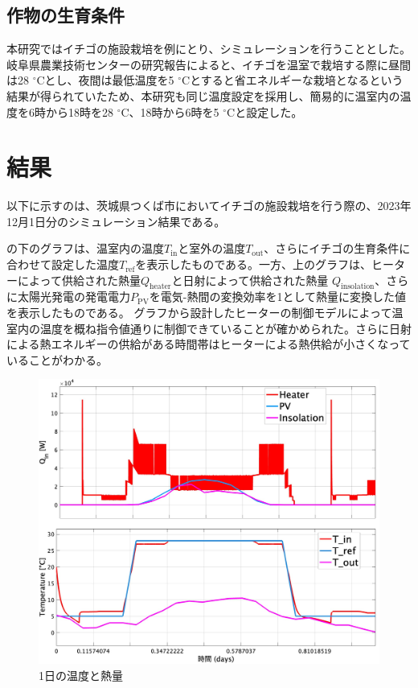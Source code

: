 \documentclass[uplatex,dvipdfmx,nomag,a4paper,oneside,onecolumn,12pt]{bxjsreport} %
\begin{document}
\section{作物の生育条件}
本研究ではイチゴの施設栽培を例にとり、シミュレーションを行うこととした。岐阜県農業技術センターの研究報告\cite{strawberry2010}によると、イチゴを温室で栽培する際に昼間は28 \(^\circ\)Cとし、夜間は最低温度を5 \(^\circ\)Cとすると省エネルギーな栽培となるという結果が得られていたため、本研究も同じ温度設定を採用し、簡易的に温室内の温度を6時から18時を28 \(^\circ\)C、18時から6時を5 \(^\circ\)Cと設定した。

\chapter{結果}
以下に示すのは、茨城県つくば市においてイチゴの施設栽培を行う際の、2023年12月1日分のシミュレーション結果である。


の下のグラフは、温室内の温度\(T_\text{in}\)と室外の温度\(T_\text{out}\)、さらにイチゴの生育条件に合わせて設定した温度\(T_\text{ref}\)を表示したものである。一方、上のグラフは、ヒーターによって供給された熱量\(Q_\text{heater}\)と日射によって供給された熱量 \(Q_\text{insolation}\)、さらに太陽光発電の発電電力\(P_\text{PV}\)を電気-熱間の変換効率を1として熱量に変換した値を表示したものである。
グラフから設計したヒーターの制御モデルによって温室内の温度を概ね指令値通りに制御できていることが確かめられた。さらに日射による熱エネルギーの供給がある時間帯はヒーターによる熱供給が小さくなっていることがわかる。


\begin{figure}[ht]
    \centering
    \includegraphics[width=0.7\linewidth]{fig/Qin-Temp.jpg}
    \caption{1日の温度と熱量}
    \label{fig:QinTemp}
\end{figure}
\end{document}
